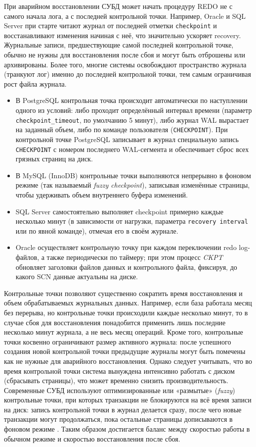  При аварийном восстановлении СУБД может начать процедуру REDO не с самого начала лога, а с последней контрольной точки. Например, Oracle и SQL Server при старте читают журнал от последней отметки \texttt{checkpoint} и восстанавливают изменения начиная с неё, что значительно ускоряет recovery. Журнальные записи, предшествующие самой последней контрольной точке, обычно не нужны для восстановления после сбоя и могут быть отброшены или архивированы. Более того, многие системы освобождают пространство журнала (транкуют лог) именно до последней контрольной точки, тем самым ограничивая рост файла журнала. 
 \begin{itemize}
    \item В PostgreSQL контрольная точка происходит автоматически по наступлении одного из условий: либо проходит определённый интервал времени (параметр \texttt{checkpoint\_timeout}, по умолчанию 5 минут), либо журнал WAL вырастает на заданный объем, либо по команде пользователя (\texttt{CHECKPOINT}). При контрольной точке PostgreSQL записывает в журнал специальную запись \texttt{CHECKPOINT} с номером последнего WAL-сегмента и обеспечивает сброс всех грязных страниц на диск. 
    \item В MySQL (InnoDB) контрольные точки выполняются непрерывно в фоновом режиме (так называемый \textit{fuzzy checkpoint}), записывая изменённые страницы, чтобы удерживать объем внутреннего буфера изменений. 
    \item SQL Server самостоятельно выполняет checkpoint примерно каждые несколько минут (в зависимости от нагрузки, параметра \texttt{recovery interval} или по явной команде), отмечая его в своём журнале. 
    \item Oracle осуществляет контрольную точку при каждом переключении redo log-файлов, а также периодически по таймеру; при этом процесс \textit{CKPT} обновляет заголовки файлов данных и контрольного файла, фиксируя, до какого SCN данные актуальны на диске. 
 \end{itemize}

 Контрольные точки позволяют существенно сократить время восстановления и объем обрабатываемых журнальных данных. Например, если база работала месяц без перерыва, но контрольные точки происходили каждые несколько минут, то в случае сбоя для восстановления понадобится применить лишь последние несколько минут журнала, а не весь месяц операций. Кроме того, контрольные точки косвенно ограничивают размер активного журнала: после успешного создания новой контрольной точки предыдущие журналы могут быть помечены как не нужные для аварийного восстановления. Однако следует учитывать, что во время контрольной точки система вынуждена интенсивно работать с диском (сбрасывать страницы), что может временно снизить производительность. Современные СУБД используют оптимизированные или «размытые» (\textit{fuzzy}) контрольные точки, при которых транзакции не блокируются на всё время записи на диск: запись контрольной точки в журнал делается сразу, после чего новые транзакции могут продолжаться, пока остальные страницы дописываются в фоновом режиме \autocite{ElmasriNavathe}. Таким образом достигается баланс между скоростью работы в обычном режиме и скоростью восстановления после сбоя.

